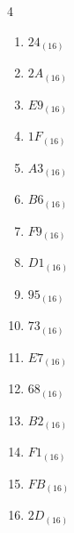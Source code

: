 \begin{multicols}{4}
\begin{enumerate}
  \item $24_{(16)}$

        \phantom{$=36$}

  \item $2A_{(16)}$

        \phantom{$=42$}

  \item $E9_{(16)}$

        \phantom{$=233$}

  \item $1F_{(16)}$

        \phantom{$=31$}

  \item $A3_{(16)}$

        \phantom{$=163$}

  \item $B6_{(16)}$

        \phantom{$=182$}

  \item $F9_{(16)}$

        \phantom{$=249$}

  \item $D1_{(16)}$

        \phantom{$=209$}

  \item $95_{(16)}$

        \phantom{$=149$}

  \item $73_{(16)}$

        \phantom{$=115$}

  \item $E7_{(16)}$

        \phantom{$=231$}

  \item $68_{(16)}$

        \phantom{$=104$}

  \item $B2_{(16)}$

        \phantom{$=178$}

  \item $F1_{(16)}$

        \phantom{$=241$}

  \item $FB_{(16)}$

        \phantom{$=251$}

\columnbreak %

  \item $2D_{(16)}$


\end{enumerate}
\end{multicols}
